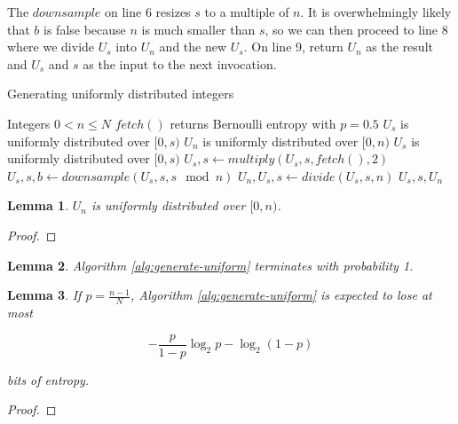 \documentclass[12pt]{article}
\newtheorem{lemma}{Lemma}
\begin{document}
The $downsample$ on line 6 resizes $s$ to a multiple of $n$. It is overwhelmingly likely that $b$ is false because $n$ is much smaller than $s$, so we can then proceed to line 8 where we divide $U_s$ into $U_n$ and the new $U_s$. On line 9, return $U_n$ as the result and $U_s$ and $s$ as the input to the next invocation.

\begin{algorithm}
\caption{Generating uniformly distributed integers}
\label{alg:generate-uniform}
\begin{algorithmic}[1]
\Require Integers $0 < n\le N$
\Require $fetch()$ returns Bernoulli entropy with $p=0.5$
\Require $U_s$ is uniformly distributed over $[0,s)$
\Ensure $U_n$ is uniformly distributed over $[0,n)$
\Ensure $U_s$ is uniformly distributed over $[0,s)$
        \State $U_s, s \gets multiply(U_s, s, fetch(), 2)$
    \EndWhile
    \State $U_s, s, b \gets downsample(U_s, s, s \mod n)$ 
        \State $U_n, U_s, s \gets divide(U_s, s, n)$
        \State \Return $U_s, s, U_n$
    \EndIf
  \EndWhile
\EndProcedure
\end{algorithmic}
\end{algorithm}

\begin{lemma}
$U_n$ is uniformly distributed over $[0,n)$.
\end{lemma}

\begin{proof}
\end{proof}

\begin{lemma}
Algorithm \ref{alg:generate-uniform} terminates with probability 1.
\end{lemma}

\begin{lemma}
    \label{lem:efficiencybinu}
If $p = \frac{n-1}{N}$, Algorithm \ref{alg:generate-uniform} is expected to lose at most

\begin{equation}
-\frac{p}{1-p}\log_2p - \log_2(1-p)
\end{equation}

bits of entropy.

\end{lemma}

\begin{proof}

\end{proof}
\end{document}
